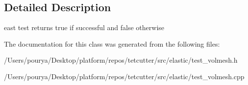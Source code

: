 \subsection{Detailed Description}
east test returns true if successful and false otherwise 

The documentation for this class was generated from the following files\+:\begin{DoxyCompactItemize}
\item 
/\+Users/pourya/\+Desktop/platform/repos/tetcutter/src/elastic/test\+\_\+volmesh.\+h\item 
/\+Users/pourya/\+Desktop/platform/repos/tetcutter/src/elastic/test\+\_\+volmesh.\+cpp\end{DoxyCompactItemize}
